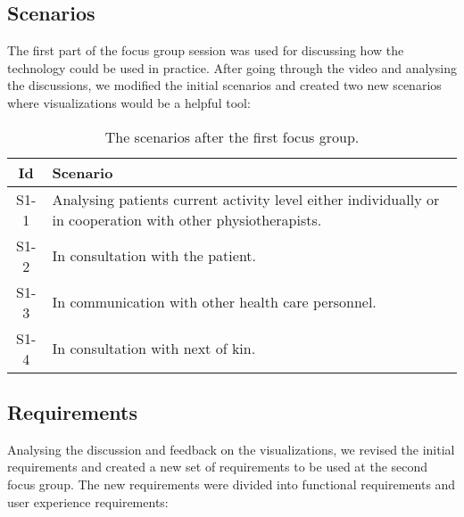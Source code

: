 \subsection{Scenarios}
The first part of the focus group session was used for discussing how the technology could be used in practice. After going through the video and analysing the discussions, we modified the initial scenarios and created two new scenarios where visualizations would be a helpful tool: 
\begin{table}[!h]
  \centering
  \begin{tabular}{|c|p{10cm}|}
    \hline
    \textbf{Id} & \textbf{Scenario} \\ \hline
    S1-1 & Analysing patients current activity level either individually or in cooperation with other physiotherapists. \\ \hline
    S1-2 & In consultation with the patient. \\ \hline
    S1-3 & In communication with other health care personnel. \\ \hline
    S1-4 & In consultation with next of kin. \\ \hline
  \end{tabular}
  \caption[Scenarios after Focus Group 1]{The scenarios after the first focus group.}
\end{table}

\subsection{Requirements}
Analysing the discussion and feedback on the visualizations, we revised the initial requirements and created a new set of requirements to be used at the second focus group. The new requirements were divided into functional requirements and user experience requirements:


